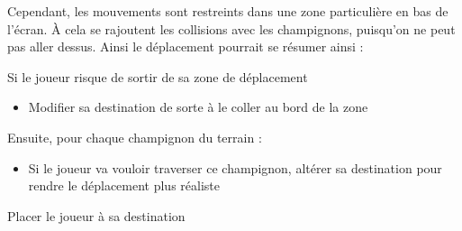 
Cependant, les mouvements sont restreints dans une zone particulière en bas de l'écran. À cela se rajoutent les collisions avec les champignons, puisqu'on ne peut pas aller dessus. Ainsi le déplacement pourrait se résumer ainsi :

\begin{algoinfo}
	\item Si le joueur risque de sortir de sa zone de déplacement
	\begin{itemize}
		\item Modifier sa destination de sorte à le coller au bord de la zone
	\end{itemize}
	\item Ensuite, pour chaque champignon du terrain :
	\begin{itemize}
		\item Si le joueur va vouloir traverser ce champignon, altérer sa destination pour rendre le déplacement plus réaliste
	\end{itemize}
	\item Placer le joueur à sa destination
\end{algoinfo}


